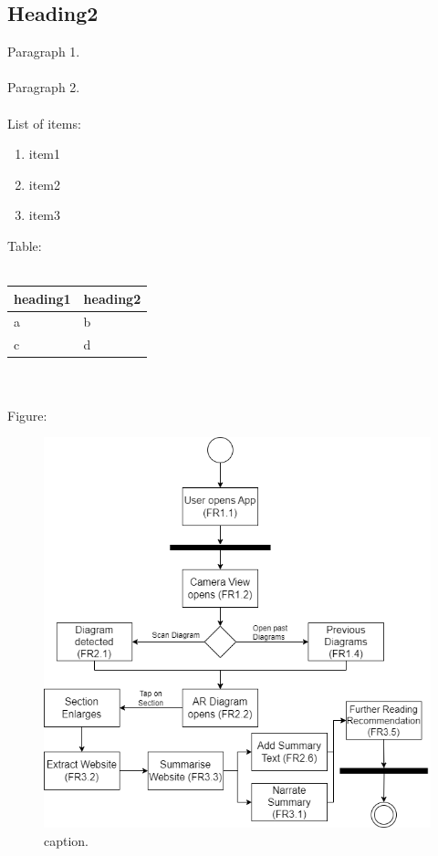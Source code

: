 \documentclass[../main.tex]{subfiles}
\begin{document}
\subsection{Heading2}
Paragraph 1.
\\\\
Paragraph 2. \cite{ref1}
\\\\
List of items:
\begin{enumerate}
    \item item1
    \item item2
    \item item3
\end{enumerate}
Table:\\\\
\begin{tabular}{ |p{3.25in}|p{3.25in}| }
    \hline
    heading1 &
    heading2
    \\\hline
    a & b
    \\\hline
    c & d
    \\\hline
\end{tabular}\\\\
Figure:
\begin{figure}[H]
    \includegraphics[scale=0.25]{../figures/fig1}
    \centering
    \caption{caption.}
    \label{fig1}
\end{figure}
\end{document}
